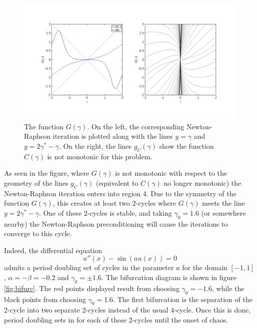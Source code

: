 \documentclass{article}
\begin{document}
\begin{figure}
	\includegraphics[width=\textwidth]{exp9_02.png}
	\caption{The function $G(\gamma)$.
	On the left, the corresponding Newton-Raphson iteration is plotted along with the lines $y=\gamma$ and $y=2 \gamma^* - \gamma$.
	On the right, the lines $g_C(\gamma)$ show the function $C(\gamma)$ is not monotonic for this problem.}
	\label{fig:exsin}
\end{figure}

As seen in the figure, where $G(\gamma)$ is not monotonic with respect to the geometry of the lines $g_C(\gamma)$ (equivalent to $C(\gamma)$ no longer monotonic) the Newton-Raphson iteration enters into region 4.
Due to the symmetry of the function $G(\gamma)$, this creates at least two 2-cycles where $G(\gamma)$ meets the line $y = 2 \gamma^* - \gamma$.
One of these 2-cycles is stable, and taking $\gamma_0 = 1.6$ (or somewhere nearby) the Newton-Raphson preconditioning will cause the iterations to converge to this cycle.

Indeed, the differential equation
\begin{equation} \label{eq:sin}
u''(x) - \sin \left ( a u(x) \right ) = 0
\end{equation}
admits a period doubling set of cycles in the parameter $a$ for the domain $[-1,1]$, $\alpha = -\beta = -0.2$ and $\gamma_0 = \pm 1.6$.
The bifurcation diagram is shown in figure \ref{fig:bifurc}.
The red points displayed result from choosing $\gamma_0 = -1.6$, while the black points from choosing $\gamma_0 = 1.6$.
The first bifurcation is the separation of the 2-cycle into two separate 2-cycles instead of the usual 4-cycle.
Once this is done, period doubling sets in for each of these 2-cycles until the onset of chaos.
\end{document}

